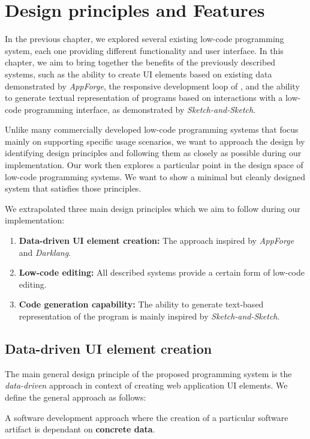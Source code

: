 \chapter{Design principles and Features}
\label{chap:design}

In the previous chapter, we explored several existing low-code programming system, each one providing different functionality and user interface.
In this chapter, we aim to bring together the benefits of the previously described systems,
such as the ability to create UI elements based on existing data demonstrated by \emph{AppForge}\cite{Yang_Gupta_Botev_Churchill_Levchenko_Shanmugasundaram_2008},
the responsive development loop of \citet{darklang}, and the ability to generate textual representation of programs based on
interactions with a low-code programming interface, as demonstrated by \emph{Sketch-and-Sketch}\cite{sketch-and-sketch}.

Unlike many commercially developed low-code programming systems that focus mainly on supporting specific usage scenarios,
we want to approach the design by identifying design principles and following them as closely as possible during our implementation.
Our work then explores a particular point in the design space of low-code programming systems.
We want to show a minimal but cleanly designed system that satisfies those principles.

We extrapolated three main design principles which we aim to follow during our implementation:
\begin{enumerate}
	\item \textbf{Data-driven UI element creation:} The approach inspired by \emph{AppForge} and \emph{Darklang}.
	\item \textbf{Low-code editing:}  All described systems provide a certain form of low-code editing.
	\item \textbf{Code generation capability:} The ability to generate text-based representation of the program is mainly inspired by \emph{Sketch-and-Sketch}.
\end{enumerate}

\section{Data-driven UI element creation}

The main general design principle of the proposed programming system is the \emph{data-driven} approach in context of creating web application UI elements.
We define the general approach as follows:
\begin{defn}
	A software development approach where the creation of a particular software artifact is dependant on \textbf{concrete data}.
\end{defn}

